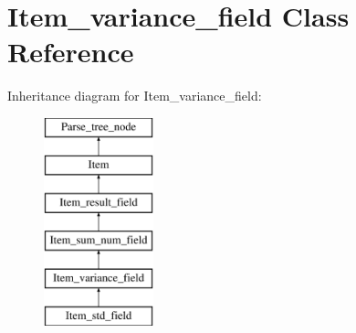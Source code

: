 \hypertarget{classItem__variance__field}{}\section{Item\+\_\+variance\+\_\+field Class Reference}
\label{classItem__variance__field}
Inheritance diagram for Item\+\_\+variance\+\_\+field\+:\begin{figure}[H]
\begin{center}
\leavevmode
\includegraphics[height=6.000000cm]{classItem__variance__field}
\end{center}
\end{figure}
